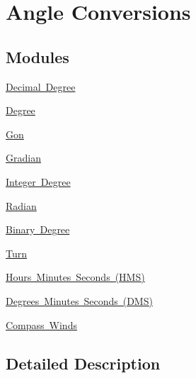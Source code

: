 \hypertarget{group___e_g_x_math-_angle_conversions}{}\section{Angle Conversions}
\label{group___e_g_x_math-_angle_conversions}
\subsection*{Modules}
\begin{DoxyCompactItemize}
\item 
\mbox{\hyperlink{group___e_g_x_math-_angle_conversions-_decimal_degree}{Decimal Degree}}
\item 
\mbox{\hyperlink{group___e_g_x_math-_angle_conversions-_degree}{Degree}}
\item 
\mbox{\hyperlink{group___e_g_x_math-_angle_conversions-_gon}{Gon}}
\item 
\mbox{\hyperlink{group___e_g_x_math-_angle_conversions-_gradian}{Gradian}}
\item 
\mbox{\hyperlink{group___e_g_x_math-_angle_conversions-_integer_degree}{Integer Degree}}
\item 
\mbox{\hyperlink{group___e_g_x_math-_angle_conversions-_radian}{Radian}}
\item 
\mbox{\hyperlink{group___e_g_x_math-_angle_conversions-_binary_degree}{Binary Degree}}
\item 
\mbox{\hyperlink{group___e_g_x_math-_angle_conversions-_turn}{Turn}}
\item 
\mbox{\hyperlink{group___e_g_x_math-_angle_conversions-_h_m_s}{Hours Minutes Seconds (\+H\+M\+S)}}
\item 
\mbox{\hyperlink{group___e_g_x_math-_angle_conversions-_d_m_s}{Degrees Minutes Seconds (\+D\+M\+S)}}
\item 
\mbox{\hyperlink{group___e_g_x_math-_angle_conversions-_compass_winds}{Compass Winds}}
\end{DoxyCompactItemize}


\subsection{Detailed Description}
